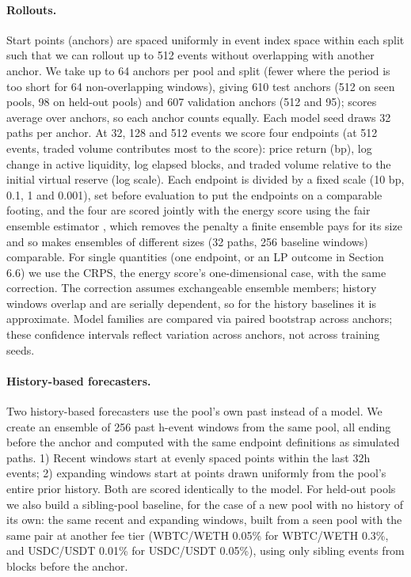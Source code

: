 \documentclass[11pt]{article}
\begin{document}
\paragraph{Rollouts.} Start points (anchors) are spaced uniformly in event index space within each split such that we can rollout up to 512 events without overlapping with another anchor. We take up to 64 anchors per pool and split (fewer where the period is too short for 64 non-overlapping windows), giving 610 test anchors (512 on seen pools, 98 on held-out pools) and 607 validation anchors (512 and 95); scores average over anchors, so each anchor counts equally. Each model seed draws 32 paths per anchor. At 32, 128 and 512 events we score four endpoints (at 512 events, traded volume contributes most to the score): price return (bp), log change in active liquidity, log elapsed blocks, and traded volume relative to the initial virtual reserve (log scale). Each endpoint is divided by a fixed scale (10 bp, 0.1, 1 and 0.001), set before evaluation to put the endpoints on a comparable footing, and the four are scored jointly with the energy score \citep{gneiting2007scoring} using the fair ensemble estimator \citep{ferro2014fair}, which removes the penalty a finite ensemble pays for its size and so makes ensembles of different sizes (32 paths, 256 baseline windows) comparable. For single quantities (one endpoint, or an LP outcome in Section 6.6) we use the CRPS, the energy score's one-dimensional case, with the same correction. The correction assumes exchangeable ensemble members; history windows overlap and are serially dependent, so for the history baselines it is approximate. Model families are compared via paired bootstrap across anchors; these confidence intervals reflect variation across anchors, not across training seeds.

\paragraph{History-based forecasters.} Two history-based forecasters use the pool's own past instead of a model. We create an ensemble of 256 past h-event windows from the same pool, all ending before the anchor and computed with the same endpoint definitions as simulated paths. 1) Recent windows start at evenly spaced points within the last 32h events; 2) expanding windows start at points drawn uniformly from the pool's entire prior history. Both are scored identically to the model. For held-out pools we also build a sibling-pool baseline, for the case of a new pool with no history of its own: the same recent and expanding windows, built from a seen pool with the same pair at another fee tier (WBTC/WETH 0.05\% for WBTC/WETH 0.3\%, and USDC/USDT 0.01\% for USDC/USDT 0.05\%), using only sibling events from blocks before the anchor.
\end{document}
